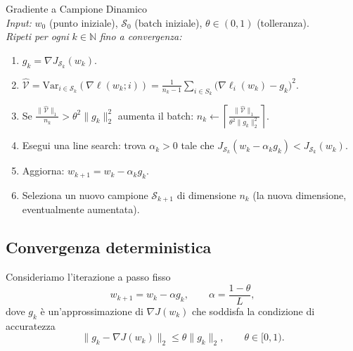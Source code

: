 \documentclass[italian, a4paper, twoside, binding=6mm]{sapthesis}
\newcommand{\Var}{\mathrm{Var}}
\begin{document}
\begin{actionbox}
  Gradiente a Campione Dinamico\\[0.3cm]
  \textit{Input:} $w_0$ (punto iniziale), $\mathcal{S}_0$ (batch iniziale), $\theta \in (0,1)$ (tolleranza).\\[0.1cm]
  \textit{Ripeti per ogni } $k \in \mathbb{N}$ \textit{ fino a convergenza:}
  \begin{enumerate}
    \item $g_k = \nabla J_{\mathcal{S}_k}(w_k)$.
    \item $\widehat{\mathcal{V}} = \Var_{i \in \mathcal{S}_k}(\nabla \ell(w_k;i)) = \frac{1}{n_k - 1} \sum_{i \in S_k} \bigl(\nabla \ell_i(w_k) - g_k\bigr)^2
$.
    \item Se $\frac{\|\widehat{\mathcal{V}}\|_1}{n_k} > \theta^2 \|g_k\|_2^2$ aumenta il batch: $n_k \leftarrow \left\lceil \frac{\|\widehat{\mathcal{V}}\|_1}{\theta^2 \|g_k\|_2^2} \right\rceil$.
    \item Esegui una line search: trova $\alpha_k > 0$ tale che $J_{\mathcal{S}_k}(w_k - \alpha_k g_k) < J_{\mathcal{S}_k}(w_k)$.
    \item Aggiorna: $w_{k+1} = w_k - \alpha_k g_k$.
    \item Seleziona un nuovo campione $\mathcal{S}_{k+1}$ di dimensione $n_k$ (la nuova dimensione, eventualmente aumentata).
  \end{enumerate}
\end{actionbox}




\newpage
\subsection{Convergenza deterministica}\label{sec:convergenza-deterministica}

Consideriamo l'iterazione a passo fisso
\[
w_{k+1} = w_k - \alpha g_k, \qquad \alpha = \frac{1-\theta}{L},
\]
dove $g_k$ è un'approssimazione di $\nabla J(w_k)$ che soddisfa la condizione di accuratezza
\[
\|g_k - \nabla J(w_k)\|_2 \leq \theta \|g_k\|_2, \qquad \theta \in [0,1).
\label{eq:discesa}
\]
\end{document}
